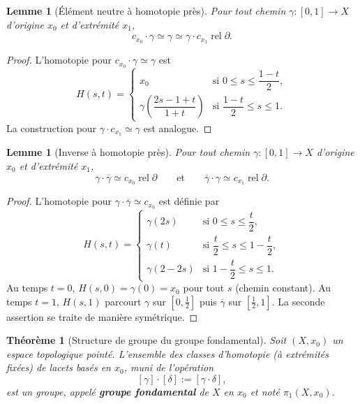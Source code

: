 \documentclass[12pt,a4paper,openany]{book}
\theoremstyle{definition}
\theoremstyle{plain}
\newtheorem{theoreme}[definition]{Théorème}
\newtheorem{lemme}[definition]{Lemme}
\theoremstyle{remark}
\newcommand{\rel}{\operatorname{rel}}
\begin{document}
\begin{lemme}[Élément neutre à homotopie près]\label{lem:neutre}
Pour tout chemin $\gamma : [0,1] \to X$ d'origine $x_0$ et d'extrémité $x_1$,
\[
c_{x_0} \cdot \gamma \simeq \gamma \simeq \gamma \cdot c_{x_1} \rel \partial.
\]
\end{lemme}

\begin{proof}
L'homotopie pour $c_{x_0} \cdot \gamma \simeq \gamma$ est
\[
H(s,t) = \begin{cases}
x_0 & \text{si } 0 \leqslant s \leqslant \dfrac{1-t}{2}, \\[4pt]
\gamma\!\left(\dfrac{2s - 1 + t}{1 + t}\right) & \text{si } \dfrac{1-t}{2} \leqslant s \leqslant 1.
\end{cases}
\]
La construction pour $\gamma \cdot c_{x_1} \simeq \gamma$ est analogue.
\end{proof}

\begin{lemme}[Inverse à homotopie près]\label{lem:inverse}
Pour tout chemin $\gamma : [0,1] \to X$ d'origine $x_0$ et d'extrémité $x_1$,
\[
\gamma \cdot \overline{\gamma} \simeq c_{x_0} \rel \partial \qquad \text{et} \qquad \overline{\gamma} \cdot \gamma \simeq c_{x_1} \rel \partial.
\]
\end{lemme}

\begin{proof}
L'homotopie pour $\gamma \cdot \overline{\gamma} \simeq c_{x_0}$ est définie par
\[
H(s,t) = \begin{cases}
\gamma(2s) & \text{si } 0 \leqslant s \leqslant \dfrac{t}{2}, \\[4pt]
\gamma(t) & \text{si } \dfrac{t}{2} \leqslant s \leqslant 1 - \dfrac{t}{2}, \\[4pt]
\gamma(2 - 2s) & \text{si } 1 - \dfrac{t}{2} \leqslant s \leqslant 1.
\end{cases}
\]
Au temps $t = 0$, $H(s,0) = \gamma(0) = x_0$ pour tout $s$ (chemin constant).
Au temps $t = 1$, $H(s,1)$ parcourt $\gamma$ sur $[0, \tfrac{1}{2}]$ puis
$\overline{\gamma}$ sur $[\tfrac{1}{2}, 1]$. La seconde assertion se traite de
manière symétrique.
\end{proof}

\begin{theoreme}[Structure de groupe du groupe fondamental]\label{thm:pi1-groupe}
Soit $(X, x_0)$ un espace topologique pointé. L'ensemble des classes d'homotopie
(à extrémités fixées) de lacets basés en $x_0$, muni de l'opération
\[
[\gamma] \cdot [\delta] := [\gamma \cdot \delta],
\]
est un groupe, appelé \textbf{groupe fondamental} de $X$ en $x_0$ et noté
$\pi_1(X, x_0)$.
\end{theoreme}
\end{document}

